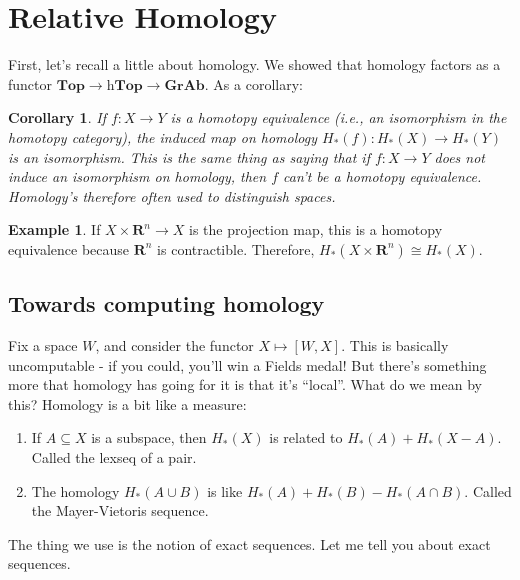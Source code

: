 \documentclass{amsart}
\theoremstyle{theorem}
\newtheorem{corollary}[theorem]{Corollary}
\theoremstyle{definition}
\newtheorem{example}[theorem]{Example}
\begin{document}
\section{Relative Homology}
First, let's recall a little about homology. We showed that homology factors as a functor $\mathbf{Top}\to\mathrm{h}\mathbf{Top}\to\mathbf{GrAb}$. As a corollary:
\begin{corollary}
If $f:X\to Y$ is a homotopy equivalence (i.e., an isomorphism in the homotopy category), the induced map on homology $ H_\ast(f): H_\ast(X)\to H_\ast(Y)$ is an isomorphism. This is the same thing as saying that if $f:X\to Y$ does not induce an isomorphism on homology, then $f$ can't be a homotopy equivalence. Homology's therefore often used to distinguish spaces.
\end{corollary}
\begin{example}
If $X\times\mathbf{R}^n\to X$ is the projection map, this is a homotopy equivalence because $\mathbf{R}^n$ is contractible. Therefore, $ H_\ast(X\times\mathbf{R}^n)\cong H_\ast(X)$.
\end{example}
\subsection{Towards computing homology}
Fix a space $W$, and consider the functor $X\mapsto [W,X]$. This is basically uncomputable - if you could, you'll win a Fields medal! But there's something more that homology has going for it is that it's ``local''. What do we mean by this? Homology is a bit like a measure:
	\begin{enumerate}
	\item If $A\subseteq X$ is a subspace, then $ H_\ast(X)$ is related to $ H_\ast(A)+ H_\ast(X-A)$. Called the lexseq of a pair.
	\item The homology $ H_\ast(A\cup B)$ is like $ H_\ast(A)+ H_\ast(B)- H_\ast(A\cap B)$. Called the Mayer-Vietoris sequence.
	\end{enumerate}
The thing we use is the notion of exact sequences. Let me tell you about exact sequences.
\end{document}
